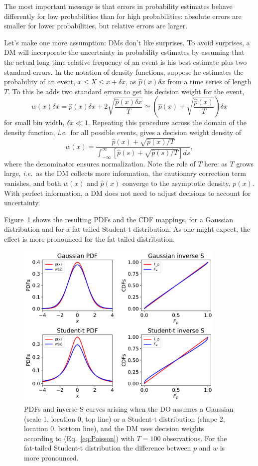\documentclass[a4paper, 12pt]{article}
\newcommand{\elabel}[1]{\label{eq:#1}}
\newcommand{\eref}[1]{(Eq.~\ref{eq:#1})}
\newcommand{\flabel}[1]{\label{fig:#1}}
\newcommand{\Fref}[1]{Figure~\ref{fig:#1}}
\newcommand{\ie}{{\it i.e.}\ }
\newcommand{\be}{\begin{equation}}
\newcommand{\ee}{\end{equation}}
\begin{document}
The most important message is that errors in probability estimates behave differently for low probabilities than for high probabilities: absolute errors are smaller for lower probabilities, but relative errors are larger. 

Let's make one more assumption: DMs don't like surprises. To avoid surprises, a DM will incorporate the uncertainty in probability estimates by assuming that the actual long-time relative frequency of an event is his best estimate plus two standard errors. In the notation of density functions, suppose he estimates the probability of an event, $x \leq X \leq x+\delta x$, as $\hat{p}(x)\delta x$ from a time series of length $T$. To this he adds two standard errors to get his decision weight for the event,
\be
w(x)\delta x = \hat{p}(x)\delta x + 2\sqrt{\frac{\hat{p}(x)\delta x}{T}}
\simeq \left(\hat{p}(x) + \sqrt{\frac{\hat{p}(x)}{T}}\right)\delta x
\ee
for small bin width, $\delta x \ll 1$. Repeating this procedure across the domain of the density function, \ie for all possible events, gives a decision weight density of
\be
w(x)=\frac{\hat{p}(x)+\sqrt{\hat{p}(x)/T}}{\int_{-\infty}^{\infty}[\hat{p}(s)+\sqrt{\hat{p}(s)/T}] ds},
\elabel{Poisson}
\ee
where the denominator ensures normalization. Note the role of $T$ here: as $T$ grows large, \ie as the DM collects more information, the cautionary correction term vanishes, and both $w(x)$ and $\hat{p}(x)$ converge to the asymptotic density, $p(x)$. With perfect information, a DM does not need to adjust decisions to account for uncertainty.

\Fref{square_root_error} shows the resulting PDFs and the CDF mappings, for a Gaussian distribution and for a fat-tailed Student-t distribution. As one might expect, the effect is more pronounced for the fat-tailed distribution.
\begin{figure}[htb]
\centering
\includegraphics[width=0.9\textwidth]{./figs/square_root_error.pdf}
\caption{PDFs and inverse-S curves arising when the DO assumes a Gaussian (scale 1, location 0, top line) or a Student-t distribution (shape 2, location 0, bottom line), and the DM uses decision weights according to \eref{Poisson} with $T=100$ observations. For the fat-tailed Student-t distribution the difference between $p$ and $w$ is more pronounced.}
\flabel{square_root_error}
\end{figure}
\end{document}
